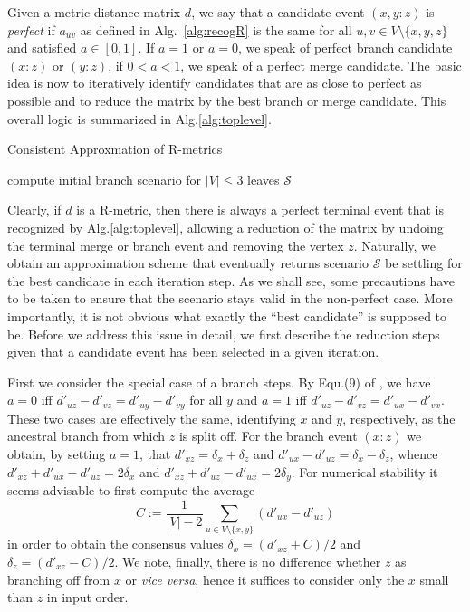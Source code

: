 \documentclass[amsmath]{lni}
\begin{document}
Given a metric distance matrix $d$, we say
that a candidate event $(x,y:z)$ is \emph{perfect} if $a_{uv}$ as defined
in Alg.~\ref{alg:recogR} is the same for all $u,v\in V\setminus\{x,y,z\}$
and satisfied $a\in [0,1]$. If $a=1$ or $a=0$, we speak of perfect branch
candidate $(x:z)$ or $(y:z)$, if $0<a<1$, we speak of a perfect merge
candidate. The basic idea is now to iteratively identify candidates that
are as close to perfect as possible and to reduce the matrix by the best
branch or merge candidate. This overall logic is summarized in
Alg.\ref{alg:toplevel}.

\begin{algorithm}[H]
\caption{Consistent Approxmation of R-metrics}
\label{alg:toplevel}
\SetAlgoLined
{}
compute initial branch scenario for $|V|\le 3$ leaves\;
\Return $\mathcal{S}$ 
\end{algorithm} 

Clearly, if $d$ is a R-metric, then there is always a perfect terminal
event that is recognized by Alg.\ref{alg:toplevel}, allowing a reduction of
the matrix by undoing the terminal merge or branch event and removing the
vertex $z$. Naturally, we obtain an approximation scheme that eventually
returns scenario $\mathcal{S}$ be settling for the best candidate in each
iteration step. As we shall see, some precautions have to be taken to
ensure that the scenario stays valid in the non-perfect case. More
importantly, it is not obvious what exactly the ``best candidate'' is
supposed to be. Before we address this issue in detail, we first describe
the reduction steps given that a candidate event has been selected in a
given iteration.

First we consider the special case of a branch steps. By Equ.(9) of
\cite{Prohaska:17a}, we have $a=0$ iff $d'_{uz}-d'_{vz} = d'_{uy}-d'_{vy}$
for all $y$ and $a=1$ iff $d'_{uz}-d'_{vz} = d'_{ux}-d'_{vx}$. These two
cases are effectively the same, identifying $x$ and $y$, respectively, as
the ancestral branch from which $z$ is split off. For the branch event
$(x:z)$ we obtain, by setting $a=1$, that $d'_{xz}=\delta_x+\delta_z$ and
$d'_{ux}-d'_{uz}=\delta_x-\delta_z$, whence
$d'_{xz}+d'_{ux}-d'_{uz}=2\delta_x$ and
$d'_{xz}+d'_{uz}-d'_{ux}=2\delta_y$. For numerical stability it seems
advisable to first compute the average
\begin{equation} 
  C := \frac{1}{|V|-2} \sum_{u\in V\setminus\{x,y\}} (d'_{ux}-d'_{uz})
\end{equation} 
in order to obtain the consensus values $\delta_x = (d'_{xz}+C)/2$ and
$\delta_z = (d'_{xz}-C)/2$.  We note, finally, there is no difference
whether $z$ as branching off from $x$ or \textit{vice versa}, hence it
suffices to consider only the $x$ small than $z$ in input order. 
\end{document}
